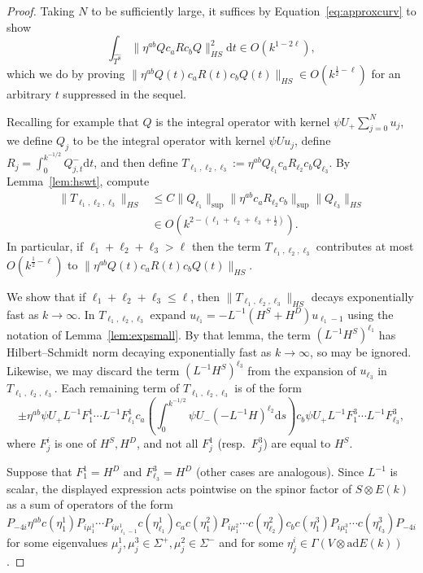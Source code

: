 \documentclass{article}
\newcommand{\di}{\mathrm{d}}
\newcommand{\wh}{\widehat}
\newcommand{\inv}{^{-1}}
\newcommand{\ad}{\mathrm{ad}}
\newcommand{\Spectrum}{\Sigma}
\theoremstyle{definition}
\theoremstyle{remark}
\begin{document}
\begin{proof}
    Taking $N$ to be sufficiently large, it suffices by Equation~\eqref{eq:approxcurv} to show
\[
    \int_{\wh{T^8}} \|\eta^{ab} Q c_a R c_b Q \|^2_{HS} \di t \in O(k^{1-2\ell}),
\]
which we do by proving $\|\eta^{ab} Q(t) c_a R(t) c_b Q(t)\|_{HS}  \in O(k^{\tfrac12-\ell})$ for an arbitrary $t$ suppressed in the sequel.

Recalling for example that $Q$ is the integral operator with kernel $\psi U_+ \sum_{j=0}^N u_j$, we define $Q_j$ to be the integral operator with kernel $\psi U u_j$, define $R_j = \int_0^{k^{-1/2}} Q^{-}_{j,t} \di t$, and then define $T_{\ell_1,\ell_2,\ell_3} := \eta^{ab} Q_{\ell_1} c_a R_{\ell_2} c_b Q_{\ell_3}$.
By Lemma~\ref{lem:hswt}, compute
\begin{align*}
    \| T_{\ell_1,\ell_2,\ell_3}\|_{HS} &\le C\|Q_{\ell_1}\|_{\sup} \|\eta^{ab} c_a R_{\ell_2} c_b\|_{\sup} \|Q_{\ell_3}\|_{HS} \\
                                       &\in O(k^{2-(\ell_1+\ell_2+\ell_3+\tfrac12)}).
\end{align*}
In particular, if $\ell_1+\ell_2+\ell_3 > \ell$ then the term $T_{\ell_1,\ell_2,\ell_3}$ contributes at most $O(k^{\tfrac12-\ell})$ to $\|\eta^{ab} Q(t) c_a R(t) c_b Q(t)\|_{HS}$.

We show that if $\ell_1 + \ell_2 + \ell_3 \le \ell$, then $\|T_{\ell_1,\ell_2,\ell_3}\|_{HS}$ decays exponentially fast as $k \to \infty$.
In $T_{\ell_1,\ell_2,\ell_3}$ expand $u_{\ell_1} = -L\inv (H^S + H^D) u_{\ell_1 - 1}$ using the notation of Lemma~\ref{lem:expsmall}.
By that lemma, the term $(L\inv H^S)^{\ell_1}$ has Hilbert--Schmidt norm decaying exponentially fast as $k \to \infty$, so may be ignored.
Likewise, we may discard the term $(L\inv H^S)^{\ell_3}$ from the expansion of $u_{\ell_3}$ in $T_{\ell_1,\ell_2,\ell_3}$.
Each remaining term of $T_{\ell_1,\ell_2,\ell_3}$ is of the form
\[
    \pm \eta^{ab} \psi U_+ L\inv F^1_1 \cdots L\inv F^1_{\ell_1}c_a \left( \int_0^{k^{-1/2}} \psi U_- (-L\inv H)^{\ell_2} \di s \right)c_b \psi U_+ L\inv F^3_1 \cdots L\inv F^3_{\ell_3},
\]
where $F^i_j$ is one of $H^S, H^D$, and not all $F^1_j$ (resp.\ $F^3_j$) are equal to $H^S$.

Suppose that $F^1_1 = H^D$ and $F^3_{\ell_3} = H^D$ (other cases are analogous).
Since $L\inv$ is scalar, the displayed expression acts pointwise on the spinor factor of $S \otimes E(k)$ as a sum of operators of the form
\begin{equation*}
    P_{-4i} \eta^{ab} c(\eta^1_1) P_{i\mu^1_1} \cdots P_{i\mu^1_{\ell_1-1}} c(\eta^1_{\ell_1}) c_a c(\eta^2_1) P_{i\mu^2_1} \cdots c(\eta^2_{\ell_2}) c_b c(\eta^3_1) P_{i\mu^3_1} \cdots c(\eta^3_{\ell_3}) P_{-4i} \tag{$\star$}
\end{equation*}
for some eigenvalues $\mu^1_j, \mu^3_j \in \Spectrum^+, \mu^2_j \in \Spectrum^-$ and for some $\eta^i_j \in \Gamma(V \otimes \ad E(k))$.


\end{proof}
\end{document}
